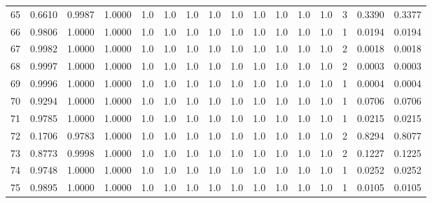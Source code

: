\begin{tabular}{lrrrrrrrrrrrrrrr}
65  &      0.6610 &  0.9987 &  1.0000 &     1.0 &     1.0 &     1.0 &     1.0 &     1.0 &     1.0 &     1.0 &      1.0 &        1.0 &      3 &                    0.3390 &                     0.3377 \\
66  &      0.9806 &  1.0000 &  1.0000 &     1.0 &     1.0 &     1.0 &     1.0 &     1.0 &     1.0 &     1.0 &      1.0 &        1.0 &      1 &                    0.0194 &                     0.0194 \\
67  &      0.9982 &  1.0000 &  1.0000 &     1.0 &     1.0 &     1.0 &     1.0 &     1.0 &     1.0 &     1.0 &      1.0 &        1.0 &      2 &                    0.0018 &                     0.0018 \\
68  &      0.9997 &  1.0000 &  1.0000 &     1.0 &     1.0 &     1.0 &     1.0 &     1.0 &     1.0 &     1.0 &      1.0 &        1.0 &      2 &                    0.0003 &                     0.0003 \\
69  &      0.9996 &  1.0000 &  1.0000 &     1.0 &     1.0 &     1.0 &     1.0 &     1.0 &     1.0 &     1.0 &      1.0 &        1.0 &      1 &                    0.0004 &                     0.0004 \\
70  &      0.9294 &  1.0000 &  1.0000 &     1.0 &     1.0 &     1.0 &     1.0 &     1.0 &     1.0 &     1.0 &      1.0 &        1.0 &      1 &                    0.0706 &                     0.0706 \\
71  &      0.9785 &  1.0000 &  1.0000 &     1.0 &     1.0 &     1.0 &     1.0 &     1.0 &     1.0 &     1.0 &      1.0 &        1.0 &      1 &                    0.0215 &                     0.0215 \\
72  &      0.1706 &  0.9783 &  1.0000 &     1.0 &     1.0 &     1.0 &     1.0 &     1.0 &     1.0 &     1.0 &      1.0 &        1.0 &      2 &                    0.8294 &                     0.8077 \\
73  &      0.8773 &  0.9998 &  1.0000 &     1.0 &     1.0 &     1.0 &     1.0 &     1.0 &     1.0 &     1.0 &      1.0 &        1.0 &      2 &                    0.1227 &                     0.1225 \\
74  &      0.9748 &  1.0000 &  1.0000 &     1.0 &     1.0 &     1.0 &     1.0 &     1.0 &     1.0 &     1.0 &      1.0 &        1.0 &      1 &                    0.0252 &                     0.0252 \\
75  &      0.9895 &  1.0000 &  1.0000 &     1.0 &     1.0 &     1.0 &     1.0 &     1.0 &     1.0 &     1.0 &      1.0 &        1.0 &      1 &                    0.0105 &                     0.0105 \\

\end{tabular}
